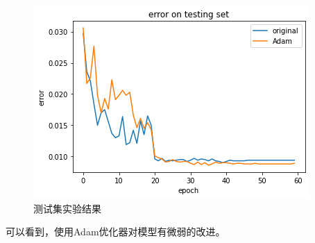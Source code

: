 \documentclass{article}
\begin{document}
\begin{figure}[h]
\includegraphics[width=\textwidth]
{Result/DessiLBI LeNet original/figure.png}
\caption{测试集实验结果}
\label{fig:DessiLBItest}
\end{figure}

可以看到，使用Adam优化器对模型有微弱的改进。
\end{document}

